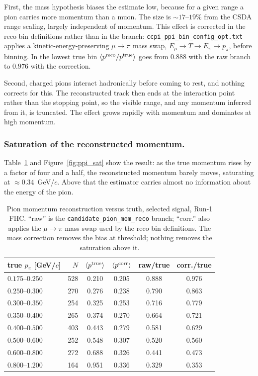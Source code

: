 \documentclass[11pt,a4paper]{article}
\begin{document}
First, the mass hypothesis biases the estimate low, because for a given range a
pion carries more momentum than a muon. The size is $\sim\!17$--$19\%$ from the CSDA
range scaling, largely independent of momentum. This effect is corrected in the reco
bin definitions rather than in the branch: \texttt{ccpi\_ppi\_bin\_config\_opt.txt} applies
a kinetic-energy-preserving $\mu\to\pi$ mass swap, $E_\mu \to T \to E_\pi \to p_\pi$,
before binning. In the lowest true bin $\langle p^{\rm reco}/p^{\rm true}\rangle$ goes from
$0.888$ with the raw branch to $0.976$ with the correction.

Second, charged pions interact hadronically before coming to rest, and nothing corrects
for this. The reconstructed track then ends at the interaction point rather than the
stopping point, so the visible range, and any momentum inferred from it, is
truncated. The effect grows rapidly with momentum and dominates at high momentum.

\subsubsection{Saturation of the reconstructed momentum.}
Table~\ref{tab:ppi_sat} and Figure~\ref{fig:ppi_sat} show the result: as the
true momentum rises by a factor of four and a half, the reconstructed momentum barely
moves, saturating at $\approx0.34$~GeV/$c$. Above that the estimator carries almost no
information about the energy of the pion.

\begin{table}[htbp]\centering
\caption{Pion momentum reconstruction versus truth, selected signal, Run-1 FHC. ``raw'' is
  the \texttt{candidate\_pion\_mom\_reco} branch; ``corr.'' also applies the
  $\mu\to\pi$ mass swap used by the reco bin definitions. The mass correction removes the
  bias at threshold; nothing removes the saturation above it.}
\label{tab:ppi_sat}
\begin{tabular}{lrcccc}
\toprule
true $p_\pi$ [GeV/$c$] & $N$ & $\langle p^{\rm true}\rangle$ & $\langle p^{\rm corr}\rangle$
 & raw/true & corr./true \\\midrule
$0.175$--$0.250$ & 528 & 0.210 & 0.205 & 0.888 & 0.976 \\
$0.250$--$0.300$ & 270 & 0.276 & 0.238 & 0.790 & 0.863 \\
$0.300$--$0.350$ & 254 & 0.325 & 0.253 & 0.716 & 0.779 \\
$0.350$--$0.400$ & 265 & 0.374 & 0.270 & 0.664 & 0.721 \\
$0.400$--$0.500$ & 403 & 0.443 & 0.279 & 0.581 & 0.629 \\
$0.500$--$0.600$ & 252 & 0.548 & 0.307 & 0.520 & 0.560 \\
$0.600$--$0.800$ & 272 & 0.688 & 0.326 & 0.441 & 0.473 \\
$0.800$--$1.200$ & 164 & 0.951 & 0.336 & 0.329 & 0.353 \\
\bottomrule
\end{tabular}
\end{table}
\end{document}
